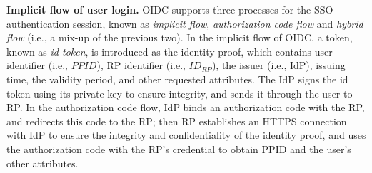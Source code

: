 

\noindent\textbf{Implicit flow of user login.}
OIDC supports three processes for the SSO authentication session, known as {\em implicit flow}, {\em authorization code flow} and {\em hybrid flow} (i.e., a mix-up of the previous two).
In the implicit flow of OIDC, a token, known as {\em id token}, is introduced as the identity proof, which contains user identifier (i.e., $PPID$), RP identifier (i.e., $ID_{RP}$), the issuer (i.e., IdP), issuing time, the validity period, and other requested attributes. The IdP signs the id token using its private key to ensure integrity, and sends it through the user to RP.
In the authorization code flow, IdP binds an authorization code with the RP, and redirects this code to the RP;
 then RP establishes an HTTPS connection with IdP to ensure the integrity and confidentiality of the identity proof, and  uses the authorization code with the RP's credential to obtain PPID and the user's other  attributes.

